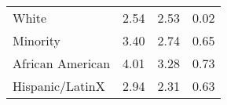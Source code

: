 \begin{table}[ht]
\centering
\begin{tabular}{lrrr}
  \hline
  \hline
White & 2.54 & 2.53 & 0.02 \\ 
  Minority & 3.40 & 2.74 & 0.65 \\ 
  African American & 4.01 & 3.28 & 0.73 \\ 
  Hispanic/LatinX  & 2.94 & 2.31 & 0.63 \\ 
   \hline
\end{tabular}
\end{table}
